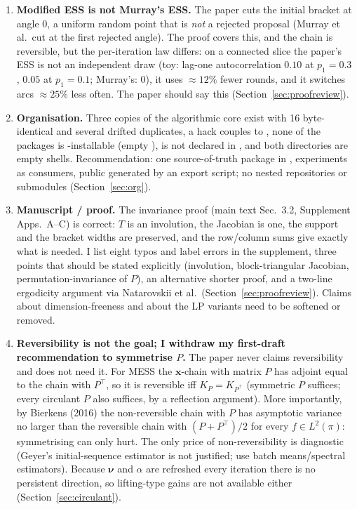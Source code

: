 \documentclass[11pt,a4paper]{article}
\theoremstyle{remark}
\newcommand{\bx}{\bm{x}}
\newcommand{\bnu}{\bm{\nu}}
\begin{document}
\begin{enumerate}[leftmargin=*]
\item \textbf{Modified ESS is not Murray's ESS.} The paper cuts the initial bracket at angle $0$, a uniform random point that is \emph{not} a rejected proposal (Murray et al.\ cut at the first rejected angle). The proof covers this, and the chain is reversible, but the per-iteration law differs: on a connected slice the paper's ESS is not an independent draw (toy: lag-one autocorrelation $0.10$ at $p_1=0.3$, $0.05$ at $p_1=0.1$; Murray's: $0$), it uses $\approx12\%$ fewer rounds, and it switches arcs $\approx25\%$ less often. The paper should say this (Section~\ref{sec:proofreview}).
\item \textbf{Organisation.} Three copies of the algorithmic core exist with 16 byte-identical and several drifted duplicates, a  hack couples  to , none of the  packages is -installable (empty ),  is not declared in , and both  directories are empty shells. Recommendation: one source-of-truth package in , experiments as consumers, public  generated by an export script; no nested repositories or submodules (Section~\ref{sec:org}).
\item \textbf{Manuscript / proof.} The invariance proof (main text Sec.~3.2, Supplement Apps.~A--C) is correct: $T$ is an involution, the Jacobian is one, the support and the bracket widths are preserved, and the row/column sums give exactly what is needed. I list eight typos and label errors in the supplement, three points that should be stated explicitly (involution, block-triangular Jacobian, permutation-invariance of $P$), an alternative shorter proof, and a two-line ergodicity argument via Natarovskii et al.\ (Section~\ref{sec:proofreview}). Claims about dimension-freeness and about the LP variants need to be softened or removed.
\item \textbf{Reversibility is not the goal; I withdraw my first-draft recommendation to symmetrise $P$.} The paper never claims reversibility and does not need it. For MESS the $\bx$-chain with matrix $P$ has adjoint equal to the chain with $P^\top$, so it is reversible iff $K_P=K_{P^\top}$ (symmetric $P$ suffices; every circulant $P$ also suffices, by a reflection argument). More importantly, by Bierkens (2016) the non-reversible chain with $P$ has asymptotic variance no larger than the reversible chain with $(P+P^\top)/2$ for every $f\in L^2(\pi)$: symmetrising can only hurt. The only price of non-reversibility is diagnostic (Geyer's initial-sequence estimator is not justified; use batch means/spectral estimators). Because $\bnu$ and $\alpha$ are refreshed every iteration there is no persistent direction, so lifting-type gains are not available either (Section~\ref{sec:circulant}).

\end{enumerate}
\end{document}
